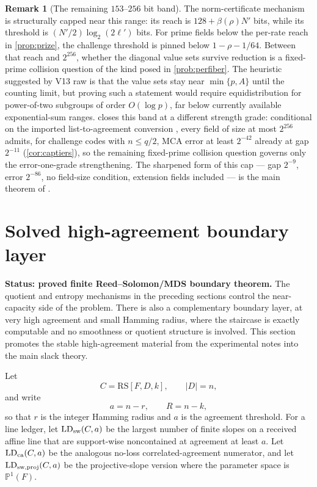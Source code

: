 \documentclass[11pt]{article}
\theoremstyle{definition}
\newtheorem{remark}[remark]{Remark}
\newcommand{\RS}{\mathrm{RS}}
\newcommand{\Acl}{A}
\begin{document}
\begin{remark}[The remaining $153$--$256$ bit band]\label{rem:capstone}
The norm-certificate mechanism is structurally capped near this range: its reach is $128+\beta(\rho)N'$ bits, while its threshold is $(N'/2)\log_2(2\ell')$ bits.  For prime fields below the per-rate reach in \cref{prop:prize}, the challenge threshold is pinned below $1-\rho-1/64$.  Between that reach and $2^{256}$, whether the diagonal value sets survive reduction is a fixed-prime collision question of the kind posed in \cref{prob:perfiber}.  The heuristic suggested by V13 raw is that the value sets stay near $\min\{p,\Acl\}$ until the counting limit, but proving such a statement would require equidistribution for power-of-two subgroups of order $O(\log p)$, far below currently available exponential-sum ranges.   closes this band at a different strength grade: conditional on the imported list-to-agreement conversion \cite{CS25,ABF26}, every field of size at most $2^{256}$ admits, for challenge codes with $n\le q/2$, MCA error at least $2^{-42}$ already at gap $2^{-11}$ (\cref{cor:captiers}), so the remaining fixed-prime collision question governs only the error-one-grade strengthening.  The sharpened form of this cap --- gap $2^{-9}$, error $2^{-86}$, no field-size condition, extension fields included --- is the main theorem of \cite{UniversalCap}.
\end{remark}



\section{Solved high-agreement boundary layer}\label{sec:solved-high-agreement-boundary}

\textbf{Status: proved finite Reed--Solomon/MDS boundary theorem.}
The quotient and entropy mechanisms in the preceding sections control the near-capacity
side of the problem.  There is also a complementary boundary layer, at very high
agreement and small Hamming radius, where the staircase is exactly computable and no
smoothness or quotient structure is involved.  This section promotes the stable
high-agreement material from the experimental notes into the main slack theory.

Let
\[
        C=\RS[F,D,k],\qquad |D|=n,
\]
and write
\[
        a=n-r,
        \qquad R=n-k,
\]
so that \(r\) is the integer Hamming radius and \(a\) is the agreement threshold.
For a line ledger, let \(\operatorname{LD}_{\rm sw}(C,a)\) be the largest number of
finite slopes on a received affine line that are support-wise noncontained at
agreement at least \(a\).  Let \(\operatorname{LD}_{\rm ca}(C,a)\) be the analogous
no-loss correlated-agreement numerator, and let
\(\operatorname{LD}_{\rm sw,proj}(C,a)\) be the projective-slope version where the
parameter space is \(\mathbb P^1(F)\).
\end{document}
